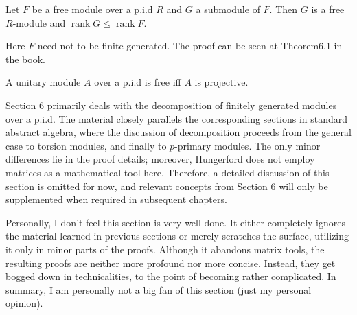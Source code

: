 \documentclass{article}
\begin{document}
\begin{theorem}
    Let $F$ be a free module over a p.i.d $R$ and $G$ a submodule of $F$. Then $G$ is a free $R$-module and $\operatorname{rank} G \leqslant  \operatorname{rank} F$.
\end{theorem}
\begin{remark}
    Here $F$ need not to be finite generated. The proof can be seen at Theorem6.1 in the book.
\end{remark}

\begin{corollary}
    A unitary module $A$ over a p.i.d is free iff $A$ is projective.
\end{corollary}
Section 6 primarily deals with the decomposition of finitely generated modules over a p.i.d. The material closely parallels the corresponding sections in standard abstract algebra, where the discussion of decomposition proceeds from the general case to torsion modules, and finally to $p$-primary modules. The only minor differences lie in the proof details; moreover, Hungerford does not employ matrices as a mathematical tool here. Therefore, a detailed discussion of this section is omitted for now, and relevant concepts from Section 6 will only be supplemented when required in subsequent chapters.

Personally, I don't feel this section is very well done. It either completely ignores the material learned in previous sections or merely scratches the surface, utilizing it only in minor parts of the proofs. Although it abandons matrix tools, the resulting proofs are neither more profound nor more concise. Instead, they get bogged down in technicalities, to the point of becoming rather complicated. In summary, I am personally not a big fan of this section (just my personal opinion).
\end{document}
